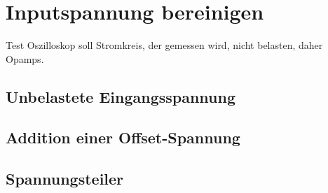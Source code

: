 \section{Inputspannung bereinigen}

Test \newline
Oszilloskop soll Stromkreis, der gemessen wird, nicht belasten, daher Opamps.

\subsection{Unbelastete Eingangsspannung}
\label{Unbelastete Eingangsspannung}

\subsection{Addition einer Offset-Spannung}
\label{Addition einer Offset-Spannung}

\subsection{Spannungsteiler}
\label{Spannungsteiler}